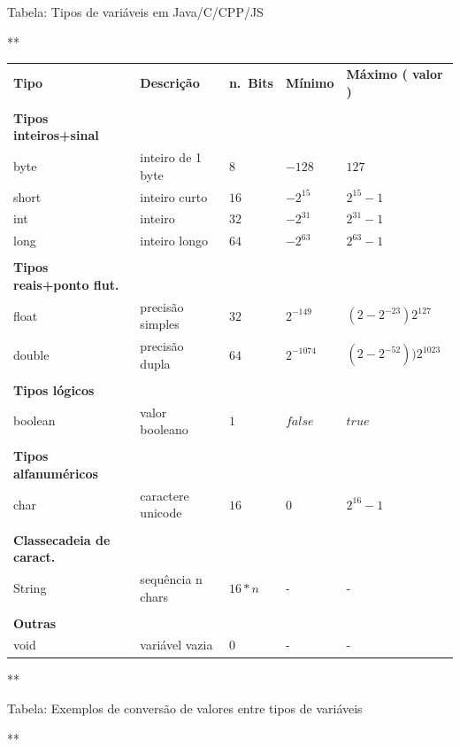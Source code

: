 \documentclass[12pt,a4paper]{article}
\begin{document}
Tabela: Tipos de variáveis em Java/C/CPP/JS

**

\begin{longtable}[]{@{}lllll@{}}
\toprule
\endhead
\textbf{Tipo} & \textbf{Descrição} & \textbf{n.~Bits} & \textbf{Mínimo}
& \textbf{Máximo ( valor )}\tabularnewline
& & & &\tabularnewline
\textbf{Tipos inteiros+sinal} & & & &\tabularnewline
byte & inteiro de 1 byte & \(8\) & \(-128\) & \(127\)\tabularnewline
short & inteiro curto & \(16\) & \(-2^{15}\) &
\(2^{15}-1\)\tabularnewline
int & inteiro & \(32\) & \(-2^{31}\) & \(2^{31}-1\)\tabularnewline
long & inteiro longo & \(64\) & \(-2^{63}\) &
\(2^{63}-1\)\tabularnewline
& & & &\tabularnewline
\textbf{Tipos reais+ponto flut.} & & & &\tabularnewline
float & precisão simples & \(32\) & \(2^{-149}\) &
\((2-2^{-23})2^{127}\)\tabularnewline
double & precisão dupla & \(64\) & \(2^{-1074}\) &
\((2-2^{-52}))2^{1023}\)\tabularnewline
& & & &\tabularnewline
\textbf{Tipos lógicos} & & & &\tabularnewline
boolean & valor booleano & \(1\) & \(false\) & \(true\)\tabularnewline
& & & &\tabularnewline
\textbf{Tipos alfanuméricos} & & & &\tabularnewline
char & caractere unicode & \(16\) & \(0\) & \(2^{16}-1\)\tabularnewline
& & & &\tabularnewline
\textbf{Classecadeia de caract.} & & & &\tabularnewline
String & sequência n chars & \(16*n\) & - & -\tabularnewline
& & & &\tabularnewline
\textbf{Outras} & & & &\tabularnewline
void & variável vazia & \(0\) & - & -\tabularnewline
\bottomrule
\end{longtable}

    **

Tabela: Exemplos de conversão de valores entre tipos de variáveis

**
\end{document}
